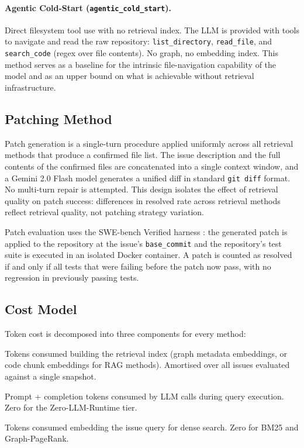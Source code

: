 \paragraph{Agentic Cold-Start (\texttt{agentic\_cold\_start}).}
Direct filesystem tool use with no retrieval index. The LLM is provided with tools to navigate and read the raw repository: \texttt{list\_directory}, \texttt{read\_file}, and \texttt{search\_code} (regex over file contents). No graph, no embedding index. This method serves as a baseline for the intrinsic file-navigation capability of the model and as an upper bound on what is achievable without retrieval infrastructure.

\subsection{Patching Method}
\label{sec:patching_method}

Patch generation is a single-turn procedure applied uniformly across all retrieval methods that produce a confirmed file list. The issue description and the full contents of the confirmed files are concatenated into a single context window, and a Gemini 2.0 Flash model generates a unified diff in standard \texttt{git diff} format. No multi-turn repair is attempted. This design isolates the effect of retrieval quality on patch success: differences in resolved rate across retrieval methods reflect retrieval quality, not patching strategy variation.

Patch evaluation uses the SWE-bench Verified harness \citep{swebench2024}: the generated patch is applied to the repository at the issue's \texttt{base\_commit} and the repository's test suite is executed in an isolated Docker container. A patch is counted as resolved if and only if all tests that were failing before the patch now pass, with no regression in previously passing tests.

\subsection{Cost Model}
\label{sec:cost_model}

Token cost is decomposed into three components for every method:

\begin{description}[leftmargin=1em,style=nextline]
  \item[Setup embedding tokens] Tokens consumed building the retrieval index (graph metadata embeddings, or code chunk embeddings for RAG methods). Amortised over all issues evaluated against a single snapshot.
  \item[Runtime LLM tokens] Prompt + completion tokens consumed by LLM calls during query execution. Zero for the Zero-LLM-Runtime tier.
  \item[Query embedding tokens] Tokens consumed embedding the issue query for dense search. Zero for BM25 and Graph-PageRank.
\end{description}

